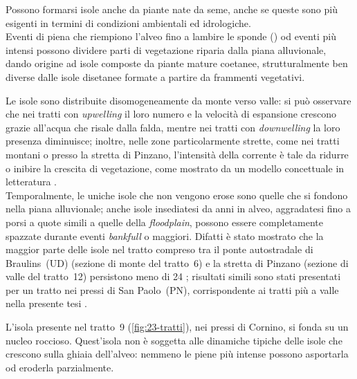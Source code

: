 Possono formarsi isole anche da piante nate da seme, anche se queste sono più esigenti in termini di condizioni ambientali ed idrologiche.
\\
Eventi di piena che riempiono l'alveo fino a lambire le sponde (\bankfull{}) od eventi più intensi possono dividere parti di vegetazione riparia dalla piana alluvionale, dando origine ad isole composte da piante mature coetanee, strutturalmente ben diverse dalle isole disetanee formate a partire da frammenti vegetativi.

Le isole sono distribuite disomogeneamente da monte verso valle: si può osservare che nei tratti con \emph{upwelling} il loro numero e la velocità di espansione crescono grazie all'acqua che risale dalla falda, mentre nei tratti con \emph{downwelling} la loro presenza diminuisce;
inoltre, nelle zone particolarmente strette, come nei tratti montani o presso la stretta di Pinzano, l'intensità della corrente è tale da ridurre o inibire la crescita di vegetazione, come mostrato da un modello concettuale in letteratura .
\\
Temporalmente, le uniche isole che non vengono erose sono quelle che si fondono nella piana alluvionale; anche isole insediatesi da anni in alveo, aggradatesi fino a porsi a quote simili a quelle della \emph{floodplain}, possono essere completamente spazzate durante eventi \emph{bankfull} o maggiori.
Difatti è stato mostrato che la maggior parte delle isole nel tratto compreso tra il ponte autostradale di Braulins~(UD) (sezione di monte del tratto~6) e la stretta di Pinzano (sezione di valle del tratto~12) persistono meno di \SI{24}{\anni} ; risultati simili sono stati presentati per un tratto nei pressi di San Paolo~(PN), corrispondente ai tratti più a valle nella presente tesi .

L'isola presente nel tratto~9 (\cref{fig:23-tratti}), nei pressi di Cornino, si fonda su un nucleo roccioso.
Quest'isola non è soggetta alle dinamiche tipiche delle isole che crescono sulla ghiaia dell'alveo: nemmeno le piene più intense possono asportarla od eroderla parzialmente.


